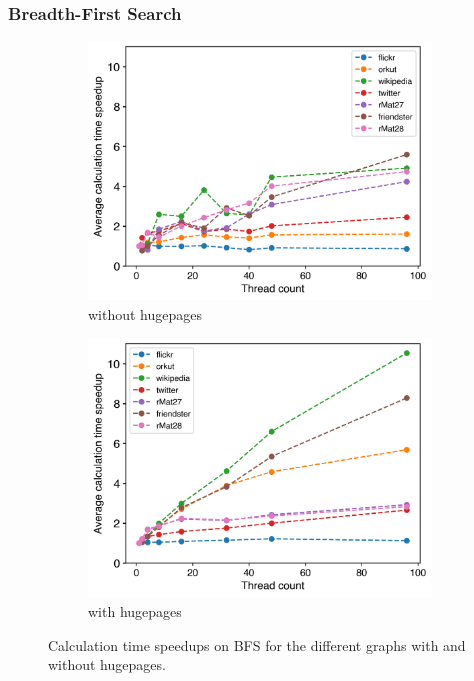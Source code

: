 \subsubsection{Breadth-First Search}
\begin{figure}
	\hfil
	\begin{subfigure}{0.4\textwidth}
		\includegraphics[width=\linewidth]{../../plots/singleNodeBFSGaloisThreads.png}
		\caption{without hugepages}
		\label{fig:galoisSpeedupBFS_noHP}
	\end{subfigure}
	\begin{subfigure}{0.4\textwidth}
		\includegraphics[width=\linewidth]{../../plots/singleNodeBFSGaloisHPThreads.png}
		\caption{with hugepages}
		\label{fig:galoisSpeedupBFS_HP}
	\end{subfigure}
	\hfil
	\caption{Calculation time speedups on BFS for the different graphs with and without hugepages.}
	\label{fig:galoisSpeedupBFS}
\end{figure}
